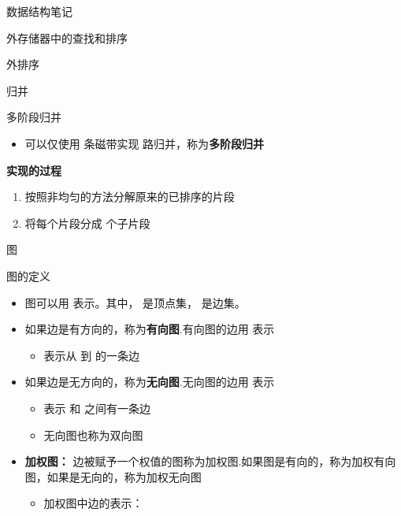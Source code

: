 \documentclass[
  ignorenonframetext,
]{beamer}
\providecommand{\tightlist}{%
  \setlength{\itemsep}{0pt}\setlength{\parskip}{0pt}}
\begin{document}
\begin{frame}[fragile]{数据结构笔记}
\begin{block}{外存储器中的查找和排序}
\begin{block}{外排序}
\begin{block}{归并}
\begin{block}{多阶段归并}
\protect{}\label{ux591aux9636ux6bb5ux5f52ux5e76}
\begin{itemize}
\tightlist
\item
  可以仅使用 {} 条磁带实现 {} 路归并，称为\textbf{多阶段归并}
\end{itemize}

\textbf{实现的过程}

\begin{enumerate}
\tightlist
\item
  按照非均匀的方法分解原来的已排序的片段
\item
  将每个片段分成 {} 个子片段
\end{enumerate}
\end{block}
\end{block}
\end{block}
\end{block}

\begin{block}{图}
\protect{}\label{ux56fe}
\begin{block}{图的定义}
\protect{}\label{ux56feux7684ux5b9aux4e49}
\begin{itemize}
\tightlist
\item
  图可以用 {} 表示。其中，{} 是顶点集，{} 是边集。
\item
  如果边是有方向的，称为\textbf{有向图}.有向图的边用 {} 表示

  \begin{itemize}
  \tightlist
  \item
    {} 表示从 {} 到 {} 的一条边
  \end{itemize}
\item
  如果边是无方向的，称为\textbf{无向图}.无向图的边用 {} 表示

  \begin{itemize}
  \tightlist
  \item
    {} 表示 {} 和 {} 之间有一条边
  \item
    无向图也称为双向图
  \end{itemize}
\item
  \textbf{加权图：}
  边被赋予一个权值的图称为加权图.如果图是有向的，称为加权有向图，如果是无向的，称为加权无向图

  \begin{itemize}
  \tightlist
  \item
    加权图中边的表示：{}
  \end{itemize}
\end{itemize}
\end{block}


\end{block}
\end{frame}
\end{document}
